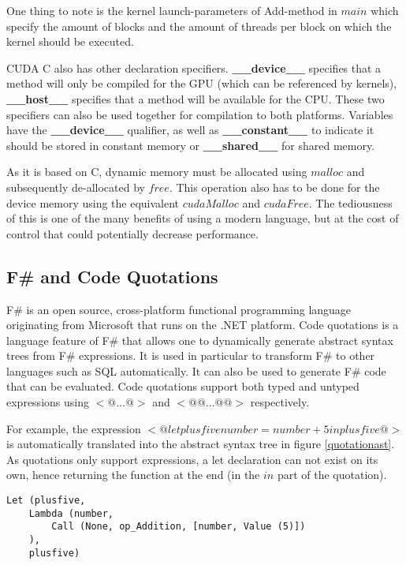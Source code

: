 One thing to note is the kernel launch-parameters of Add-method in $main$ which specify the amount of blocks and the amount of threads per block on which the kernel should be executed. 

CUDA C also has other declaration specifiers. 
\textbf{\_\_device\_\_} specifies that a method will only be compiled for the GPU (which can be referenced by kernels), \textbf{\_\_host\_\_} specifies that a method will be available for the CPU.
These two specifiers can also be used together for compilation to both platforms.
Variables have the \textbf{\_\_device\_\_} qualifier, as well as \textbf{\_\_constant\_\_} to indicate it should be stored in constant memory or \textbf{\_\_shared\_\_} for shared memory.

As it is based on C, dynamic memory must be allocated using $malloc$ and subsequently de-allocated by $free$.
This operation also has to be done for the device memory using the equivalent $cudaMalloc$ and $cudaFree$.
The tediousness of this is one of the many benefits of using a modern language, but at the cost of control that could potentially decrease performance.

\subsection{F\# and Code Quotations}
F\#\cite{fsharp} is an open source, cross-platform functional programming language originating from Microsoft that runs on the .NET platform.
Code quotations is a language feature of F\# that allows one to dynamically generate abstract syntax trees from F\# expressions. 
It is used in particular to transform F\# to other languages such as SQL automatically. 
It can also be used to generate F\# code that can be evaluated. 
Code quotations support both typed and untyped expressions using $<@ ... @>$ and $<@@ ... @@>$ respectively. 

For example, the expression $<@ let plusfive number = number + 5 in plusfive @>$ is automatically translated into the abstract syntax tree in figure \ref{quotationast}. 
As quotations only support expressions, a let declaration can not exist on its own, hence returning the function at the end (in the $in$ part of the quotation).

\begin{lstlisting}[caption=Abstract syntax tree for the example quotation expression, label=quotationast]
Let (plusfive, 
	Lambda (number, 
		Call (None, op_Addition, [number, Value (5)])
	), 
	plusfive)
\end{lstlisting}

